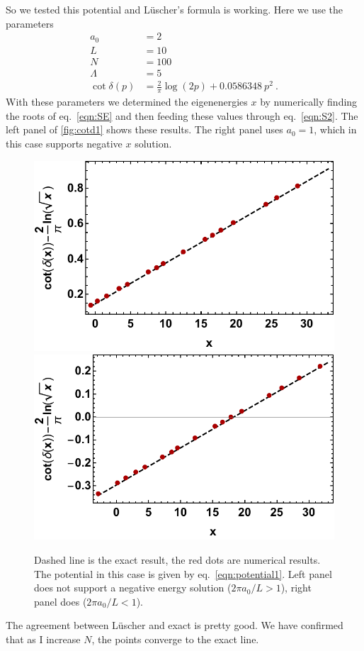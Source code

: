 So we tested this potential and L\"uscher's formula is working.  Here we use the parameters
\begin{align*}
a_0&=2 \\
L&=10 \\
N&=100\\
\Lambda&= 5\\
\cot\delta(p)&=\frac{2}{\pi} \log (2 p)+0.0586348 \ p^2\ .
\end{align*}
With these parameters we determined the eigenenergies $x$ by numerically finding the roots of eq.~\eqref{eqn:SE} and then feeding these values through eq.~\eqref{eqn:S2}. The left panel of \autoref{fig:cotd1} shows these results.  The right panel uses $a_0=1$, which in this case supports negative $x$ solution.
\begin{figure}
\center
\includegraphics[width=.4925\textwidth]{figure/cotd1.pdf}\includegraphics[width=.5075\textwidth]{figure/cotd4.pdf}
\caption{Dashed line is the exact result, the red dots are numerical results.  The potential in this case is given by eq.~\eqref{eqn:potential1}.  Left panel does not support a negative energy solution ($2\pi a_0/L>1$), right panel does ($2\pi a_0/L<1$).\label{fig:cotd1}}
\end{figure}
The agreement between L\"uscher and exact is pretty good.  We have confirmed that as I increase $N$, the points converge to the exact line.  

